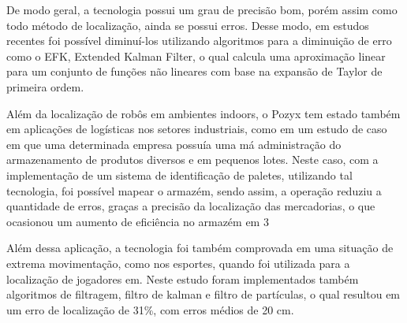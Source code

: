 De modo geral, a tecnologia possui um grau de precisão bom, porém assim como todo método de localização, ainda se possui erros. Desse modo, em estudos recentes foi possível diminuí-los utilizando algoritmos para a diminuição de erro como o EFK, Extended Kalman Filter, o qual calcula uma aproximação linear para um conjunto de funções não lineares com base na expansão de Taylor de primeira ordem.

Além da localização de robôs em ambientes indoors, o Pozyx tem estado também em aplicações de logísticas nos setores industriais, como em um estudo de caso em que uma determinada empresa possuía uma má administração do  armazenamento de produtos diversos e em pequenos lotes. Neste caso, com a implementação de um sistema de identificação de paletes, utilizando tal tecnologia, foi possível mapear o armazém, sendo assim, a operação reduziu a quantidade de erros, graças a precisão da localização das mercadorias, o que ocasionou um aumento de eficiência no armazém em 3%

Além dessa aplicação, a tecnologia foi também comprovada em uma situação de extrema movimentação, como nos esportes, quando foi utilizada para a localização de jogadores em. Neste estudo foram implementados também algoritmos de filtragem, filtro de kalman e filtro de partículas, o qual resultou em um erro de localização de 31\%, com erros médios de 20 cm. 





